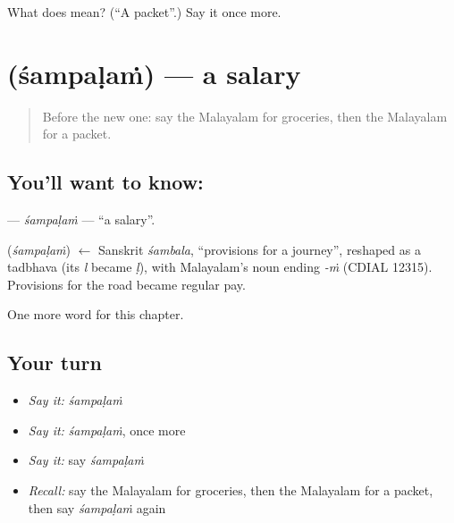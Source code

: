 \begin{tcolorbox}[breakable,colback=teal!4,colframe=teal!35!black,title={Before you move on}]
What does  mean? (\textquotedblleft{}A packet\textquotedblright{}.) Say it once more.
\end{tcolorbox}
\section[\texorpdfstring{\ml{ശമ്പളം} (śampaḷaṁ)}{ശമ്പളം (śampaḷaṁ)}]{ (śampaḷaṁ) — a salary}

\label{lesson:ML-C298-sambalam}



\begin{quote}
Before the new one: say the Malayalam for groceries, then the Malayalam for a packet.
\end{quote}

\subsection*{You'll want to know: }
\textbf{} — \emph{śampaḷaṁ} — \textquotedblleft{}a salary\textquotedblright{}.

\begin{cousinweb}
\textbf{} (\emph{śampaḷaṁ}) $\leftarrow$ Sanskrit \emph{śambala}, \textquotedblleft{}provisions for a journey\textquotedblright{}, reshaped as a tadbhava (its \emph{l} became \emph{ḷ}), with Malayalam's noun ending \emph{-ṁ} (CDIAL 12315). Provisions for the road became regular pay.
\end{cousinweb}

\begin{grammarlens}[title={What you've built}]
One more word for this chapter.
\end{grammarlens}

\subsection*{Your turn}
\begin{itemize}
\raggedright
  \item \emph{Say it:} \emph{śampaḷaṁ}
  \item \emph{Say it:} \emph{śampaḷaṁ}, once more
  \item \emph{Say it:} say \emph{śampaḷaṁ}
  \item \emph{Recall:} say the Malayalam for groceries, then the Malayalam for a packet, then say \emph{śampaḷaṁ} again
\end{itemize}

